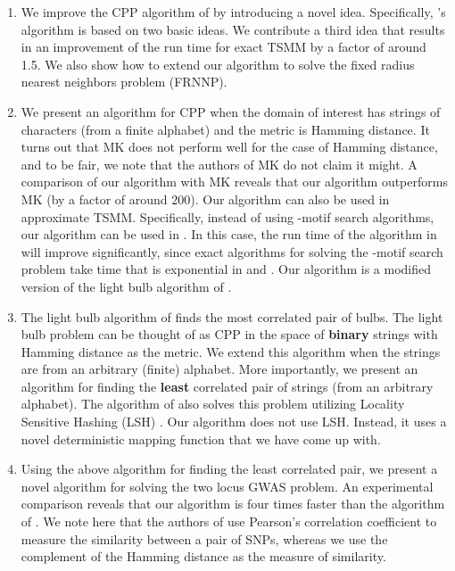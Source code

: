\documentclass{article}
\theoremstyle{definition}
\theoremstyle{remark}
\begin{document}
\begin{enumerate}
\item We improve the CPP algorithm of \cite{AEQSB09} by introducing a novel idea. Specifically, \cite{AEQSB09}'s algorithm is based on two basic ideas. We contribute a third idea that results in an improvement of the run time for exact TSMM by a factor of around 1.5. We also show how to extend our algorithm to solve the fixed radius nearest neighbors problem (FRNNP).
\item We present an algorithm for CPP when the domain of interest has strings of characters (from a finite alphabet) and the metric is Hamming distance. It turns out that MK does not perform well for the case of Hamming distance, and to be fair, we note that the authors of MK do not claim it might. A comparison of our algorithm with MK reveals that our algorithm outperforms MK (by a factor of around 200). Our algorithm can also be used in approximate TSMM. Specifically, instead of using -motif search algorithms, our algorithm can be used in \cite{BES03}. In this case, the run time of the algorithm in \cite{BES03} will improve significantly, since exact algorithms for solving the -motif search problem take time that is exponential in  and . Our algorithm is a modified version of the light bulb algorithm of \cite{RSJ89}.
\item The light bulb algorithm of \cite{RSJ89} finds the most correlated pair of bulbs. The light bulb problem can be thought of as CPP in the space of {\bf binary} strings with Hamming distance as the metric. We extend this algorithm when the strings are from an arbitrary (finite) alphabet. More importantly, we present an algorithm for finding the {\bf least} correlated pair of strings (from an arbitrary alphabet). The algorithm of \cite{PBK11} also solves this problem utilizing Locality Sensitive Hashing (LSH) \cite{M02}. Our algorithm does not use LSH. Instead, it uses a novel deterministic mapping function that we have come up with.
\item Using the above algorithm for finding the least correlated pair, we present a novel algorithm for solving the two locus GWAS problem. An experimental comparison reveals that our algorithm is four times faster than the algorithm of \cite{PBK11}. We note here that the authors of \cite{PBK11} use Pearson's correlation coefficient to measure the similarity between a pair of SNPs, whereas we use the complement of the Hamming distance as the measure of similarity.
\end{enumerate}
\end{document}
